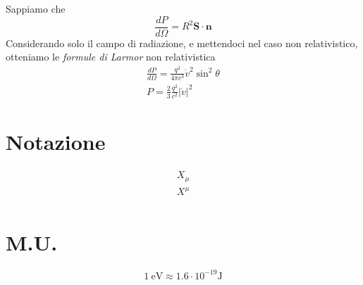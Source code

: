 \documentclass[a4paper, twocolumn]{article}
\begin{document}
Sappiamo che
\begin{equation}
  \label{eq:27}
  \frac{dP}{d\Omega}=R^2 \mathbf{S}\cdot\mathbf{n}
\end{equation}
Considerando solo il campo di radiazione, e mettendoci nel caso non relativistico, otteniamo le \emph{formule di Larmor} non relativistica
\begin{align}
  \label{eq:26}
  \frac{dP}{d\Omega}=\frac{q^2}{4\pi c^3}\dot{v}^2\sin^2\theta \\
  P=\frac{2}{3}\frac{q^2}{c^2}\left| \dot{v}\right|^2
\end{align}

\section{Notazione}
\label{sec:notazione}
\begin{align}
  \label{eq:11}
  X_{\mu} \tag*{covariante} \\
  X^{\mu} \tag*{controvariante} \\
\end{align}

\section{M.U.}
\begin{equation}
	1 ~\mathrm{eV} \approx 1.6 \cdot 10^{-19} \mathrm{J}
\end{equation}
\end{document}
